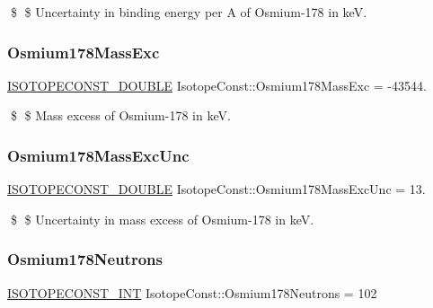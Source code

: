 \$ \$ Uncertainty in binding energy per A of Osmium-\/178 in keV. \mbox{\label{group___isotope_const-_osmium-_os178_ga3fe1b61626be9376e314c0d74ab0f168}} 
\subsubsection{\texorpdfstring{Osmium178\+Mass\+Exc}{Osmium178MassExc}}
{\footnotesize\ttfamily \mbox{\hyperlink{group___isotope_const-_macros_ga8f45a7272ce02c0b4c65c44636ed719a}{I\+S\+O\+T\+O\+P\+E\+C\+O\+N\+S\+T\+\_\+\+D\+O\+U\+B\+LE}} Isotope\+Const\+::\+Osmium178\+Mass\+Exc = -\/43544.}

\$ \$ Mass excess of Osmium-\/178 in keV. \mbox{\label{group___isotope_const-_osmium-_os178_ga2f8761f1ff5ab78b57621566d653f910}} 
\subsubsection{\texorpdfstring{Osmium178\+Mass\+Exc\+Unc}{Osmium178MassExcUnc}}
{\footnotesize\ttfamily \mbox{\hyperlink{group___isotope_const-_macros_ga8f45a7272ce02c0b4c65c44636ed719a}{I\+S\+O\+T\+O\+P\+E\+C\+O\+N\+S\+T\+\_\+\+D\+O\+U\+B\+LE}} Isotope\+Const\+::\+Osmium178\+Mass\+Exc\+Unc = 13.}

\$ \$ Uncertainty in mass excess of Osmium-\/178 in keV. \mbox{\label{group___isotope_const-_osmium-_os178_gae5d342ef2cdcb27e081d0bf5a58ff7ec}} 
\subsubsection{\texorpdfstring{Osmium178\+Neutrons}{Osmium178Neutrons}}
{\footnotesize\ttfamily \mbox{\hyperlink{group___isotope_const-_macros_ga5f18360b3e99483a35c32d789e62621c}{I\+S\+O\+T\+O\+P\+E\+C\+O\+N\+S\+T\+\_\+\+I\+NT}} Isotope\+Const\+::\+Osmium178\+Neutrons = 102}

